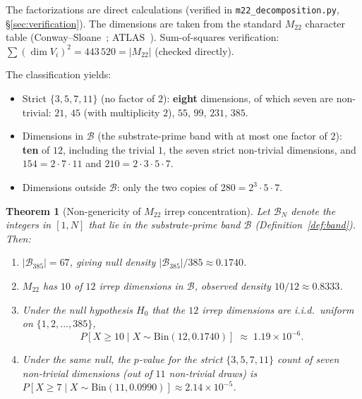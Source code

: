 \documentclass[11pt,reqno]{amsart}
\theoremstyle{plain}
\newtheorem{theorem}{Theorem}[section]
\theoremstyle{definition}
\theoremstyle{remark}
\newcommand{\Mtwentytwo}{M_{22}}
\begin{document}
The factorizations are direct calculations (verified in
\texttt{m22\_decomposition.py}, \S\ref{sec:verification}). The
dimensions are taken from the standard $\Mtwentytwo$ character table
(Conway--Sloane~\cite{ConwaySloane1999}; ATLAS~\cite{ATLAS1985}).
Sum-of-squares verification: $\sum (\dim V_{i})^{2} = 443\,520 =
|\Mtwentytwo|$ (checked directly).

The classification yields:
\begin{itemize}\setlength\itemsep{2pt}
\item Strict $\{3, 5, 7, 11\}$ (no factor of $2$):
\textbf{eight} dimensions, of which seven are non-trivial:
$21$, $45$ (with multiplicity $2$), $55$, $99$, $231$, $385$.
\item Dimensions in $\mathcal{B}$ (the substrate-prime band with
at most one factor of $2$): \textbf{ten} of $12$, including the
trivial $1$, the seven strict non-trivial dimensions, and
$154 = 2 \cdot 7 \cdot 11$ and $210 = 2 \cdot 3 \cdot 5 \cdot 7$.
\item Dimensions outside $\mathcal{B}$: only the two copies of
$280 = 2^{3} \cdot 5 \cdot 7$.
\end{itemize}

\begin{theorem}[Non-genericity of $\Mtwentytwo$ irrep concentration]
\label{thm:nongenericity}
Let $\mathcal{B}_{N}$ denote the integers in $[1, N]$ that lie in
the substrate-prime band $\mathcal{B}$ (Definition~\ref{def:band}).
Then:
\begin{enumerate}\setlength\itemsep{4pt}
\item $|\mathcal{B}_{385}| = 67$, giving null density
$|\mathcal{B}_{385}| / 385 \approx 0.1740$.
\item $\Mtwentytwo$ has $10$ of $12$ irrep dimensions in
$\mathcal{B}$, observed density $10/12 \approx 0.8333$.
\item Under the null hypothesis $H_{0}$ that the $12$ irrep
dimensions are i.i.d.\ uniform on $\{1, 2, \ldots, 385\}$,
\[
  P[X \ge 10 \mid X \sim \mathrm{Bin}(12, 0.1740)]
  \;\approx\; 1.19 \times 10^{-6}.
\]
\item Under the same null, the $p$-value for the strict
$\{3, 5, 7, 11\}$ count of seven non-trivial dimensions (out of $11$
non-trivial draws) is
$P[X \ge 7 \mid X \sim \mathrm{Bin}(11, 0.0990)] \approx 2.14
\times 10^{-5}$.
\end{enumerate}
\end{theorem}
\end{document}
